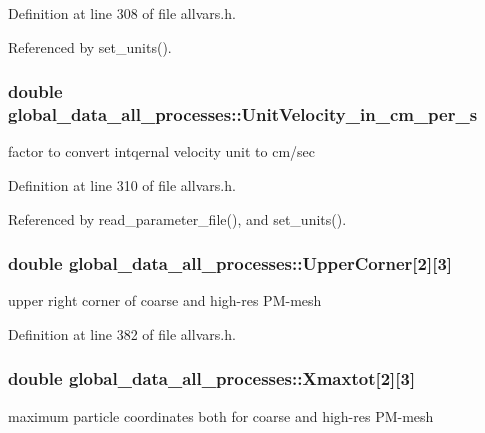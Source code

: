 Definition at line 308 of file allvars.h.



Referenced by set\_\-units().

\hypertarget{structglobal__data__all__processes_a04f4a1972c99f3ab4ba2483237a9d8ab}{
\subsubsection[{UnitVelocity\_\-in\_\-cm\_\-per\_\-s}]{\setlength{\rightskip}{0pt plus 5cm}double {\bf global\_\-data\_\-all\_\-processes::UnitVelocity\_\-in\_\-cm\_\-per\_\-s}}}
\label{structglobal__data__all__processes_a04f4a1972c99f3ab4ba2483237a9d8ab}
factor to convert intqernal velocity unit to cm/sec 

Definition at line 310 of file allvars.h.



Referenced by read\_\-parameter\_\-file(), and set\_\-units().

\hypertarget{structglobal__data__all__processes_a2a0fb0d1cda3309f002d1c0984209111}{
\subsubsection[{UpperCorner}]{\setlength{\rightskip}{0pt plus 5cm}double {\bf global\_\-data\_\-all\_\-processes::UpperCorner}\mbox{[}2\mbox{]}\mbox{[}3\mbox{]}}}
\label{structglobal__data__all__processes_a2a0fb0d1cda3309f002d1c0984209111}
upper right corner of coarse and high-\/res PM-\/mesh 

Definition at line 382 of file allvars.h.

\hypertarget{structglobal__data__all__processes_a3818f3c9b2979834f6938c7f18b39b0e}{
\subsubsection[{Xmaxtot}]{\setlength{\rightskip}{0pt plus 5cm}double {\bf global\_\-data\_\-all\_\-processes::Xmaxtot}\mbox{[}2\mbox{]}\mbox{[}3\mbox{]}}}
\label{structglobal__data__all__processes_a3818f3c9b2979834f6938c7f18b39b0e}
maximum particle coordinates both for coarse and high-\/res PM-\/mesh 

